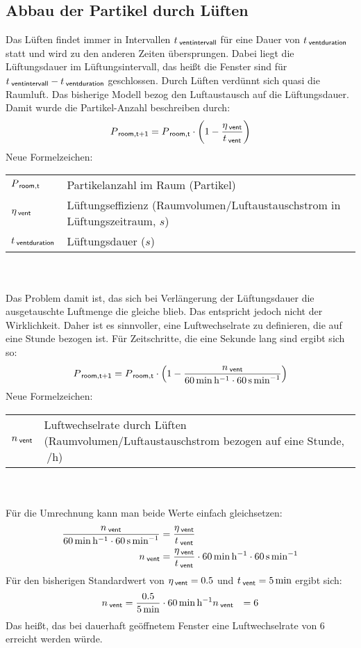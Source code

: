 \documentclass[12pt,a4paper,bibtotocnumbered,liststotocnumbered]{scrreprt}
\newenvironment{parameterNames}{Neue Formelzeichen:\\ \begin{tabular}{ll}}{\end{tabular} \\ \\}
\begin{document}
\subsection{Abbau der Partikel durch Lüften}
Das Lüften findet immer in Intervallen $t_{\: \mathsf{ventintervall}} $ für eine Dauer von  $t_{\: \mathsf{ventduration}}$ statt und wird zu den anderen Zeiten übersprungen. Dabei liegt die Lüftungsdauer im Lüftungsintervall, das heißt die Fenster sind für $t_{\: \mathsf{ventintervall}} - t_{\: \mathsf{ventduration}}$ geschlossen. Durch Lüften verdünnt sich quasi die Raumluft. Das bisherige Modell bezog den Luftaustausch auf die Lüftungsdauer. Damit wurde  die Partikel-Anzahl beschreiben durch:
\begin{align}
P_{\: \mathsf{room,t+1}} = P_{\: \mathsf{room,t}} \cdot \left( 1 -  \frac{\eta_{\: \mathsf{vent}}}{t_{\: \mathsf{vent}}}\right)
\end{align}
\begin{parameterNames}
$P_{\: \mathsf{room,t}} $ & Partikelanzahl im Raum (Partikel)\\
$\eta_{\: \mathsf{vent}}$ & Lüftungseffizienz (Raumvolumen/Luftaustauschstrom in Lüftungszeitraum, $s$)\\
$t_{\: \mathsf{ventduration}} $ & Lüftungsdauer ($s$)\\
\end{parameterNames}
Das Problem damit ist, das sich bei Verlängerung der Lüftungsdauer die ausgetauschte Luftmenge die gleiche blieb. Das entspricht jedoch nicht der Wirklichkeit. Daher ist es sinnvoller, eine Luftwechselrate zu definieren, die auf eine Stunde bezogen ist. Für Zeitschritte, die eine Sekunde lang sind ergibt sich so:
\begin{align}
P_{\: \mathsf{room,t+1}} = P_{\: \mathsf{room,t}} \cdot \left( 1 -  \frac{n_{\: \mathsf{vent}}}{\SI{60}{\minute\per\hour}\cdot \SI{60}{\second\per\minute}}\right)
\end{align}
\begin{parameterNames}
$n_{\: \mathsf{vent}}$ & Luftwechselrate durch Lüften (Raumvolumen/Luftaustauschstrom bezogen auf eine Stunde, $\SI{}{\per\hour}$)\\
\end{parameterNames}
Für die Umrechnung kann man beide Werte einfach gleichsetzen:
\begin{align}
\frac{n_{\: \mathsf{vent}}}{\SI{60}{\minute\per\hour}\cdot \SI{60}{\second\per\minute}} &= \frac{\eta_{\: \mathsf{vent}}}{t_{\: \mathsf{vent}}}\\
n_{\: \mathsf{vent}} &= \frac{\eta_{\: \mathsf{vent}}}{t_{\: \mathsf{vent}}}\cdot \SI{60}{\minute\per\hour}\cdot \SI{60}{\second\per\minute}
\end{align}
Für den bisherigen Standardwert von $\eta_{\: \mathsf{vent}} = 0.5$ und $t_{\: \mathsf{vent}} = \SI{5}{\minute}$  ergibt sich:
\begin{align}
n_{\: \mathsf{vent}} &= \frac{0.5}{\SI{5}{\minute}}\cdot \SI{60}{\minute\per\hour}
n_{\: \mathsf{vent}} &= 6
\end{align}
Das heißt, das bei dauerhaft geöffnetem Fenster eine Luftwechselrate von 6 erreicht werden würde.
\end{document}

